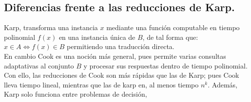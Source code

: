 \subsection{Diferencias frente a las reducciones de Karp.} 
Karp, transforma una instancia $x$ mediante una función computable en tiempo polinomial $f(x)$ en una instancia única de $B$, de tal forma que: $x\in A \iff f(x)\in B$ permitiendo una traducción directa.\\
En cambio Cook es una noción más general, pues permite varias consultas adaptativas al conjunto $B$ y procesar sus respuestas dentro de tiempo polinomial.\\
Con ello, las reducciones de Cook son más rápidas que las de Karp; pues Cook lleva tiempo lineal, mientras que las de karp en, al menos tiempo $n^k$.
Además, Karp solo funciona entre problemas de decisión,
